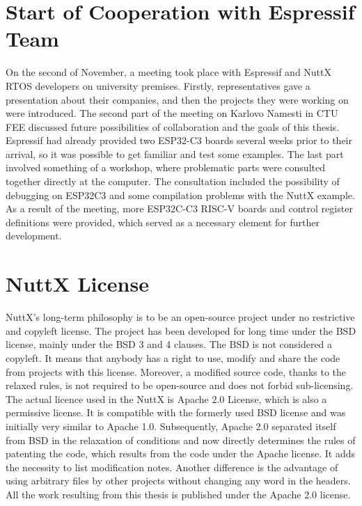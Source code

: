 \documentclass{ctuthesis}
\begin{document}
 \section{Start of Cooperation with Espressif Team}
  On the second of November, a meeting took place with Espressif and NuttX RTOS developers on university premises. Firstly, representatives gave a presentation about their companies, and then the projects they were working on were introduced. The second part of the meeting on Karlovo Namesti in CTU FEE discussed future possibilities of collaboration and the goals of this thesis. Espressif had already provided two ESP32-C3 boards several weeks prior to their arrival, so it was possible to get familiar and test some examples. The last part involved something of a workshop, where problematic parts were  consulted together directly at the computer. The consultation included the possibility of debugging on ESP32C3 and some compilation problems with the NuttX example. As a result of the meeting, more ESP32C-C3 RISC-V boards and control register definitions were provided, which served as a necessary element for further development.

 \section{NuttX License}
  NuttX’s long-term philosophy is to be an open-source project under no restrictive and copyleft license. The project has been developed for long time under the BSD license, mainly under the BSD 3 and 4 clauses\cite{license_bsd}. The BSD is not considered a copyleft. It means that anybody has a right to use, modify and share the code from projects with this license. Moreover, a modified source code, thanks to the relaxed rules, is not required to be open-source and does not forbid sub-licensing. The actual licence used in the NuttX is Apache 2.0 License, which is also a permissive license\cite{license_apache}. It is compatible with the formerly used BSD license and was initially very similar to Apache 1.0. Subsequently, Apache 2.0 separated itself from BSD in the relaxation of conditions and now directly determines the rules of patenting the code, which results from the code under the Apache license. It adds the necessity to list modification notes. Another difference is the advantage of using arbitrary files by other projects without changing any word in the headers. All the work resulting from this thesis is published under the Apache 2.0 license. 
\end{document}
